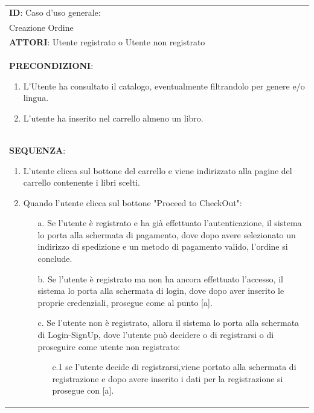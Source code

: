 \documentclass[a4paper,11pt]{report}
\begin{document}
\begin{table}[h!]
    \renewcommand*{\arraystretch}{1.2}
    \centering
    \begin{tabularx}{\textwidth}{|X|} \hline
      \textbf{ID}: Caso d'uso generale: \\ Creazione Ordine \\
      \hline
      \textbf{ATTORI}: Utente registrato o Utente non registrato \\
      \hline
      \textbf{PRECONDIZIONI}:
      \begin{enumerate}
        \item L'Utente ha consultato il catalogo, eventualmente filtrandolo per genere e/o lingua.
        \item L'utente ha inserito nel carrello almeno un libro.
      \end{enumerate} \\
      \hline
      \textbf{SEQUENZA}:
      \begin{enumerate}
        \item L'utente clicca sul bottone del carrello e viene indirizzato alla pagine del carrello contenente i libri scelti.
        \newline
        \item Quando l'utente clicca sul bottone "Proceed to CheckOut": 
        \begin{itemize}
          \item [a.] Se l'utente è registrato e ha già effettuato l'autenticazione, il sistema lo porta alla schermata di pagamento, dove dopo avere selezionato un indirizzo di spedizione e un metodo di pagamento valido, l'ordine si conclude.
          \newline
          \item [b.] Se l'utente è registrato ma non ha ancora effettuato l'accesso, il sistema lo porta alla schermata di login, dove dopo aver inserito le proprie credenziali, prosegue come al punto [a].
           \newline
          \item [c.] Se l'utente non è  registrato, allora il sistema lo porta alla schermata di Login-SignUp, dove l'utente può decidere o di registrarsi o di proseguire come utente non registrato:
          \begin{itemize}
              \item [c.1] se l'utente decide di registrarsi,viene portato alla schermata di registrazione e dopo avere inserito i dati per la registrazione si prosegue con [a].
              \newline

\end{itemize}
\end{itemize}
\end{enumerate}
\end{tabularx}
\end{table}
\end{document}
